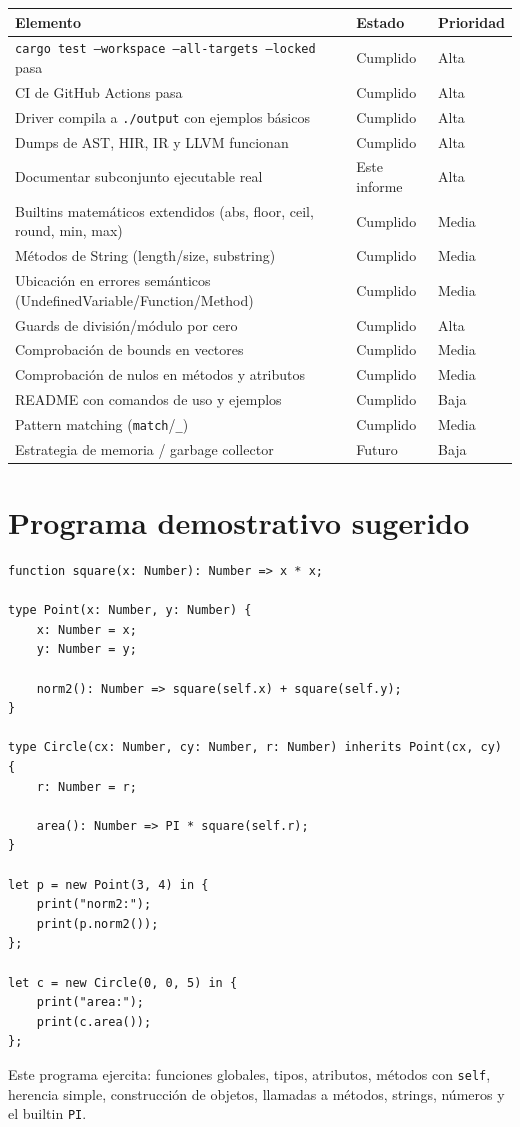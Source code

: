 \documentclass[12pt,letterpaper]{article}
\newcommand{\src}[1]{\texttt{#1}}
\begin{document}
\begin{longtable}{p{8cm}p{3cm}p{3cm}}
\toprule
\textbf{Elemento} & \textbf{Estado} & \textbf{Prioridad} \\
\midrule
\src{cargo test --workspace --all-targets --locked} pasa & Cumplido & Alta \\
CI de GitHub Actions pasa & Cumplido & Alta \\
Driver compila a \src{./output} con ejemplos básicos & Cumplido & Alta \\
Dumps de AST, HIR, IR y LLVM funcionan & Cumplido & Alta \\
Documentar subconjunto ejecutable real & Este informe & Alta \\
Builtins matemáticos extendidos (abs, floor, ceil, round, min, max) & Cumplido & Media \\
Métodos de String (length/size, substring) & Cumplido & Media \\
Ubicación en errores semánticos (UndefinedVariable/Function/Method) & Cumplido & Media \\
Guards de división/módulo por cero & Cumplido & Alta \\
Comprobación de bounds en vectores & Cumplido & Media \\
Comprobación de nulos en métodos y atributos & Cumplido & Media \\
README con comandos de uso y ejemplos & Cumplido & Baja \\
Pattern matching (\src{match}/\src{\_}) & Cumplido & Media \\
Estrategia de memoria / garbage collector & Futuro & Baja \\
\bottomrule
\end{longtable}

\section{Programa demostrativo sugerido}

\begin{lstlisting}[language=HULK,caption={Programa que recorre el pipeline completo sin usar partes frágiles}]
function square(x: Number): Number => x * x;

type Point(x: Number, y: Number) {
    x: Number = x;
    y: Number = y;

    norm2(): Number => square(self.x) + square(self.y);
}

type Circle(cx: Number, cy: Number, r: Number) inherits Point(cx, cy) {
    r: Number = r;

    area(): Number => PI * square(self.r);
}

let p = new Point(3, 4) in {
    print("norm2:");
    print(p.norm2());
};

let c = new Circle(0, 0, 5) in {
    print("area:");
    print(c.area());
};
\end{lstlisting}

Este programa ejercita: funciones globales, tipos, atributos, métodos con \src{self}, herencia simple, construcción de objetos, llamadas a métodos, strings, números y el builtin \src{PI}.
\end{document}

